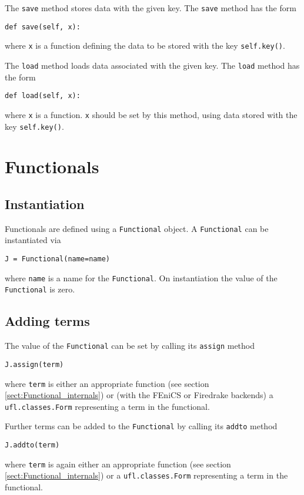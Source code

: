 \documentclass[11pt]{article}
\begin{document}
The \texttt{save} method stores data with the given key. The \texttt{save}
method has the form
\begin{lstlisting}
def save(self, x):
\end{lstlisting}
where \texttt{x} is a function defining the data to be stored with the
key \texttt{self.key()}.

The \texttt{load} method loads data associated with the given key. The
\texttt{load} method has the form
\begin{lstlisting}
def load(self, x):
\end{lstlisting}
where \texttt{x} is a function. \texttt{x} should be set by this method, using
data stored with the key \texttt{self.key()}.

\section{Functionals}\label{sect:Functional} 

\subsection{Instantiation}

Functionals are defined using a \texttt{Functional} object. A
\texttt{Functional} can be instantiated via
\begin{lstlisting}
J = Functional(name=name)
\end{lstlisting}
where \texttt{name} is a name for the \texttt{Functional}. On instantiation the
value of the \texttt{Functional} is zero.

\subsection{Adding terms}

The value of the \texttt{Functional} can be set by calling its \texttt{assign}
method
\begin{lstlisting}
J.assign(term)
\end{lstlisting}
where \texttt{term} is either an appropriate function (see section
\ref{sect:Functional_internals}) or (with the FEniCS or Firedrake backends) a
\texttt{ufl.classes.Form} representing a term in the functional.

Further terms can be added to the \texttt{Functional} by calling its
\texttt{addto} method
\begin{lstlisting}
J.addto(term)
\end{lstlisting}
where \texttt{term} is again either an appropriate function (see section
\ref{sect:Functional_internals}) or a \texttt{ufl.classes.Form} representing a
term in the functional.
\end{document}
